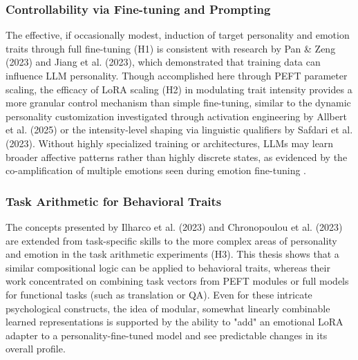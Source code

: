 \documentclass{DESSThesis}
\begin{document}
\subsubsection{Controllability via Fine-tuning and Prompting}
The effective, if occasionally modest, induction of target personality and emotion traits through full fine-tuning (H1) is consistent with research by Pan \& Zeng (2023) and Jiang et al. (2023), which demonstrated that training data can influence LLM personality. Though accomplished here through PEFT parameter scaling, the efficacy of LoRA scaling (H2) in modulating trait intensity provides a more granular control mechanism than simple fine-tuning, similar to the dynamic personality customization investigated through activation engineering by Allbert et al. (2025) or the intensity-level shaping via linguistic qualifiers by Safdari et al. (2023). Without highly specialized training or architectures, LLMs may learn broader affective patterns rather than highly discrete states, as evidenced by the co-amplification of multiple emotions seen during emotion fine-tuning \cite{chang_modeling_2024}.

\subsubsection{Task Arithmetic for Behavioral Traits}
The concepts presented by Ilharco et al. (2023) and Chronopoulou et al. (2023) are extended from task-specific skills to the more complex areas of personality and emotion in the task arithmetic experiments (H3). This thesis shows that a similar compositional logic can be applied to behavioral traits, whereas their work concentrated on combining task vectors from PEFT modules or full models for functional tasks (such as translation or QA). Even for these intricate psychological constructs, the idea of modular, somewhat linearly combinable learned representations is supported by the ability to "add" an emotional LoRA adapter to a personality-fine-tuned model and see predictable changes in its overall profile.
\end{document}
